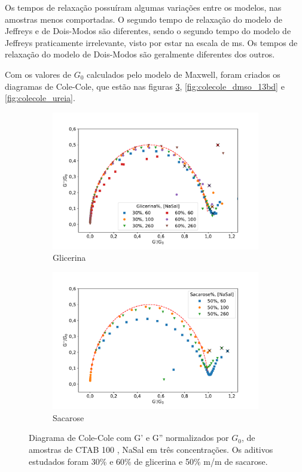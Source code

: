 		Os tempos de relaxação possuíram algumas variações entre os modelos, nas amostras menos comportadas. O segundo tempo de relaxação do modelo de Jeffreys e de Dois-Modos são diferentes, sendo o segundo tempo do modelo de Jeffreys praticamente irrelevante, visto por estar na escala de ms. Os tempos de relaxação do modelo de Dois-Modos são geralmente diferentes dos outros.
		
		Com os valores de \(G_0\) calculados pelo modelo de Maxwell, foram criados os diagramas de Cole-Cole, que estão nas figuras \ref{fig:colecole_glicerina_sacarose}, \ref{fig:colecole_dmso_13bd} e \ref{fig:colecole_ureia}.
		

		\begin{figure}[h]
			\begin{subfigure}[t]{0.5\textwidth}
				\centering
				\includegraphics[width=\textwidth]{imagens/reologia/colecole_glicerina}
				\caption{Glicerina}
				\label{fig:colecole_glicerina}
			\end{subfigure} %
			\begin{subfigure}[t]{0.5\textwidth}
				\centering
				\includegraphics[width=\textwidth]{imagens/reologia/colecole_sacarose}
				\caption{Sacarose}
				\label{fig:colecole_sacarose}
			\end{subfigure} %
			\caption{Diagrama de Cole-Cole com G' e G'' normalizados por \(G_0\), de amostras de CTAB 100 \mM{}, NaSal em três concentrações. Os aditivos estudados foram 30\% e 60\% de glicerina e 50\% m/m de sacarose.}
			\label{fig:colecole_glicerina_sacarose}
		\end{figure}
		

